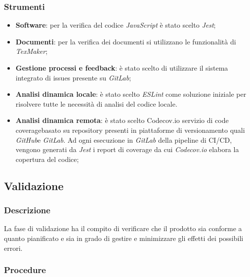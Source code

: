 \subsubsection{Strumenti}
\begin{itemize}
	\item \textbf{Software}: per la verifica del codice \textit{JavaScript} è stato scelto \textit{Jest};
	\item \textbf{Documenti}: per la verifica dei documenti si utilizzano le funzionalità di \textit{TexMaker};
	\item \textbf{Gestione processi e feedback}: è stato scelto di utilizzare il sistema integrato di issues presente su \textit{GitLab};
	\item \textbf{Analisi dinamica locale}: è stato scelto \textit{ESLint} come soluzione iniziale per risolvere tutte le necessità di analisi del codice locale.
	\item \textbf{Analisi dinamica remota}:	è stato scelto {Codecov.io} servizio di code coverage\glossario basato su repository presenti in piattaforme di versionamento quali \textit{GitHub}\glossario e \textit{GitLab}. Ad ogni esecuzione in \textit{GitLab} della pipeline di CI/CD, vengono generati da \textit{Jest} i report di coverage da cui \textit{Codecov.io} elabora la copertura del codice;
\end{itemize}

\subsection{Validazione}\label{validazione}
\subsubsection{Descrizione}
La fase di validazione ha il compito di verificare che il prodotto sia conforme a quanto pianificato e sia in grado di gestire e minimizzare gli effetti dei possibili errori.
\subsubsection{Procedure}
